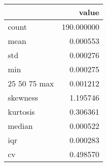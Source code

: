 \begin{tabular}{lr}
\toprule
 & value \\
\midrule
count & 190.000000 \\
mean & 0.000553 \\
std & 0.000276 \\
min & 0.000275 \\
25%
50%
75%
max & 0.001212 \\
skewness & 1.195746 \\
kurtosis & 0.306361 \\
median & 0.000522 \\
iqr & 0.000283 \\
cv & 0.498570 \\
\bottomrule
\end{tabular}
